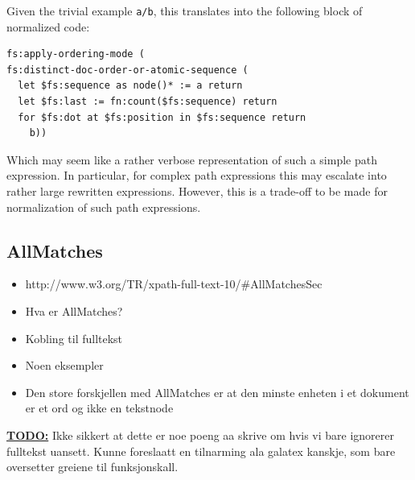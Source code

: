 Given the trivial example \verb!a/b!, this translates into the following block
of normalized code:

\begin{verbatim}
fs:apply-ordering-mode (
fs:distinct-doc-order-or-atomic-sequence (
  let $fs:sequence as node()* := a return
  let $fs:last := fn:count($fs:sequence) return
  for $fs:dot at $fs:position in $fs:sequence return
    b))
\end{verbatim}

Which may seem like a rather verbose representation of such a simple path
expression. In particular, for complex path expressions this may
escalate into rather large rewritten expressions. However, this is a trade-off
to be made for normalization of such path expressions.

\subsection{AllMatches}
\label{sect:theory:xquery:allmatches}
\begin{itemize}
  \item http://www.w3.org/TR/xpath-full-text-10/\#AllMatchesSec
  \item Hva er AllMatches?
  \item Kobling til fulltekst
  \item Noen eksempler
  \item Den store forskjellen med AllMatches er at den minste enheten i et 
        dokument er et ord og ikke en tekstnode
\end{itemize}
\textbf{\underline{\LARGE TODO:}} Ikke sikkert at dette er noe poeng aa skrive
om hvis vi bare ignorerer fulltekst uansett. Kunne foreslaatt en tilnarming ala galatex kanskje, som bare
oversetter greiene til funksjonskall.
